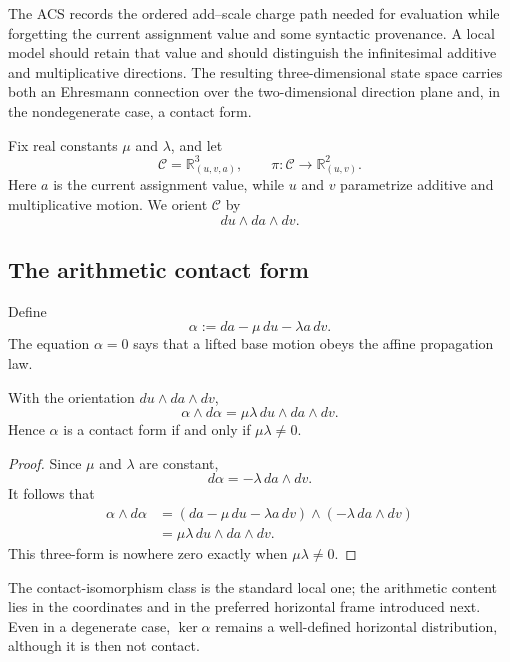 The ACS records the ordered add--scale charge path needed for evaluation while
forgetting the current assignment value and some syntactic provenance.  A local
model should retain that value and should distinguish the infinitesimal additive
and multiplicative directions.  The resulting three-dimensional state space carries
both an Ehresmann connection over the two-dimensional direction plane and, in the
nondegenerate case, a contact form.

Fix real constants \(\mu\) and \(\lambda\), and let
\[
    \mathcal C=\mathbb R^3_{(u,v,a)},
    \qquad
    \pi:\mathcal C\longrightarrow\mathbb R^2_{(u,v)}.
\]
Here \(a\) is the current assignment value, while \(u\) and \(v\) parametrize
additive and multiplicative motion.  We orient \(\mathcal C\) by
\[
    du\wedge da\wedge dv.
\]

\subsection{The arithmetic contact form}

Define
\begin{equation}
    \alpha:=da-\mu\,du-\lambda a\,dv.
    \label{eq:arithmetic-contact-form}
\end{equation}
The equation \(\alpha=0\) says that a lifted base motion obeys the affine
propagation law.

\begin{proposition}
\label{prop:contact-form}
With the orientation \(du\wedge da\wedge dv\),
\begin{equation}
    \alpha\wedge d\alpha
       =\mu\lambda\,du\wedge da\wedge dv.
    \label{eq:contact-volume-sign}
\end{equation}
Hence \(\alpha\) is a contact form if and only if \(\mu\lambda\ne0\).
\end{proposition}

\begin{proof}
Since \(\mu\) and \(\lambda\) are constant,
\[
    d\alpha=-\lambda\,da\wedge dv.
\]
It follows that
\begin{align*}
    \alpha\wedge d\alpha
      &=(da-\mu\,du-\lambda a\,dv)
        \wedge(-\lambda\,da\wedge dv)\\
      &=\mu\lambda\,du\wedge da\wedge dv.
\end{align*}
This three-form is nowhere zero exactly when \(\mu\lambda\ne0\).
\end{proof}

The contact-isomorphism class is the standard local one; the arithmetic content
lies in the coordinates and in the preferred horizontal frame introduced
next.  Even in a degenerate case, \(\ker\alpha\) remains a well-defined
horizontal distribution, although it is then not contact.

